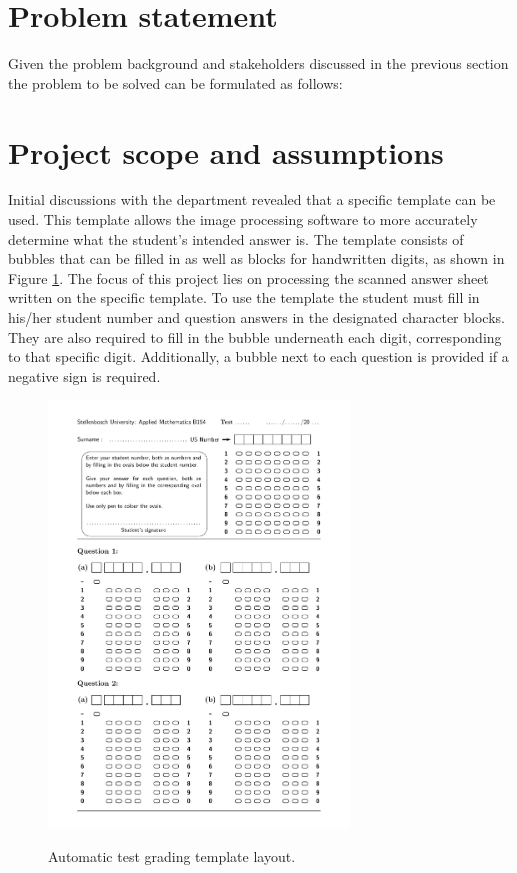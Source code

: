 \section{Problem statement}
\label{sec:problemStatement}

Given the problem background and stakeholders discussed in the previous section the problem to be solved can be formulated as follows:
\newline
\newline
\noindent{}

\section{Project scope and assumptions}\label{sec:Scope}
Initial discussions with the department revealed that a specific template can be used. This template allows the image processing software to more accurately determine what the student's intended answer is. The template consists of bubbles that can be filled in as well as blocks for handwritten digits, as shown in Figure \ref{fig:NumbersTemplate}. The focus of this project lies on processing the scanned answer sheet written on the specific template. To use the template the student must fill in his/her student number and question answers in the designated character blocks. They are also required to fill in the bubble underneath each digit, corresponding to that specific digit. Additionally, a bubble next to each question is provided if a negative sign is required.

\begin{figure}[h]
  \centering
  \includegraphics[width=8cm]{NumbersTemplate}\\
  \caption{Automatic test grading template layout.}
  \label{fig:NumbersTemplate}
\end{figure}


